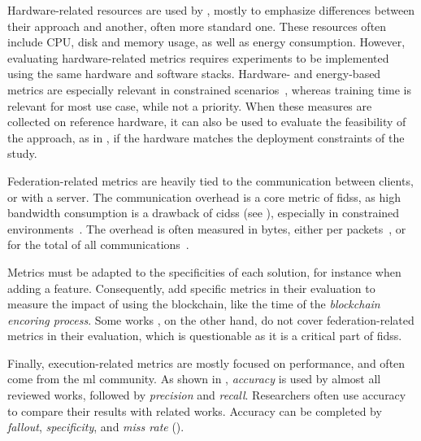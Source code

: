 Hardware-related resources are used by \cite{rathore_BlockSecIoTNetBlockchainbaseddecentralized_2019,zhao_MultiTaskNetworkAnomaly_2019}, mostly to emphasize differences between their approach and another, often more standard one.
These resources often include CPU, disk and memory usage, as well as energy consumption.
However, evaluating hardware-related metrics requires experiments to be implemented using the same hardware and software stacks.
Hardware- and energy-based metrics are especially relevant in constrained scenarios~\cite{nguyen_DIoTFederatedSelflearning_2019,schneble_Attackdetectionusing_2019}, whereas training time is relevant for most use case, while not a priority.
When these measures are collected on reference hardware, it can also be used to evaluate the feasibility of the approach, as in \cite{nguyen_DIoTFederatedSelflearning_2019}, if the hardware matches the deployment constraints of the study.




Federation-related metrics are heavily tied to the communication between clients, or with a server.
The communication overhead is a core metric of \glspl{fids}, as high bandwidth consumption is a drawback of \glspl{cids} (see ), especially in constrained environments~\cite{qin_LineSpeedScalableIntrusion_2020a}.
The overhead is often measured in bytes, either per packets~\cite{pahl_AllEyesYou_2018}, or for the total of all communications~\cite{schneble_Attackdetectionusing_2019,zhang_BlockchainbasedFederatedLearning_2020}.

Metrics must be adapted to the specificities of each solution, for instance when adding a feature.
Consequently, \textcite{zhang_BlockchainbasedFederatedLearning_2020} add specific metrics in their evaluation to measure the impact of using the blockchain, like the time of the \emph{blockchain encoring process}.
Some works \cite{rathore_BlockSecIoTNetBlockchainbaseddecentralized_2019,li_DeepFedFederatedDeep_2020,chen_Networkanomalydetection_2020,fan_IoTDefenderFederatedTransfer_2020,rahman_InternetThingsIntrusion_2020,Sun2020,al-athbaal-marri_FederatedMimicLearning_2020,Popoola2021}, on the other hand, do not cover federation-related metrics in their evaluation, which is questionable as it is a critical part of \glspl{fids}.

Finally, execution-related metrics are mostly focused on performance, and often come from the \gls{ml} community.
As shown in , \emph{accuracy} is used by almost all reviewed works, followed by \emph{precision} and \emph{recall}.
Researchers often use accuracy to compare their results with related works.
Accuracy can be completed by \emph{fallout}, \emph{specificity}, and \emph{miss rate} ().


